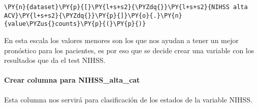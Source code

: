     \begin{tcolorbox}[breakable, size=fbox, boxrule=1pt, pad at break*=1mm,colback=cellbackground, colframe=cellborder]
\begin{Verbatim}[commandchars=\\\{\}]
\PY{n}{dataset}\PY{p}{[}\PY{l+s+s2}{\PYZdq{}}\PY{l+s+s2}{NIHSS alta ACV}\PY{l+s+s2}{\PYZdq{}}\PY{p}{]}\PY{o}{.}\PY{n}{value\PYZus{}counts}\PY{p}{(}\PY{p}{)}
\end{Verbatim}
\end{tcolorbox}

\begin{table}[H]
\centering
\setlength{\tabcolsep}{5pt}
\caption{Cantidad de pacientes en la escala NIHSS en alta}
\label{tab:nihss alta}
\end{table}
        
    En esta escala los valores menores son los que nos ayudan a tener un
mejor pronóstico para los pacientes, es por eso que se decide crear una
variable con los resultados que da el test NIHSS.

    \hypertarget{crear-columna-para-nihss_alta_cat}{%
\paragraph{Crear columna para
NIHSS\_alta\_cat}\label{crear-columna-para-nihss_alta_cat}}

Esta columna nos servirá para clasificación de los estados de la
variable NIHSS.

